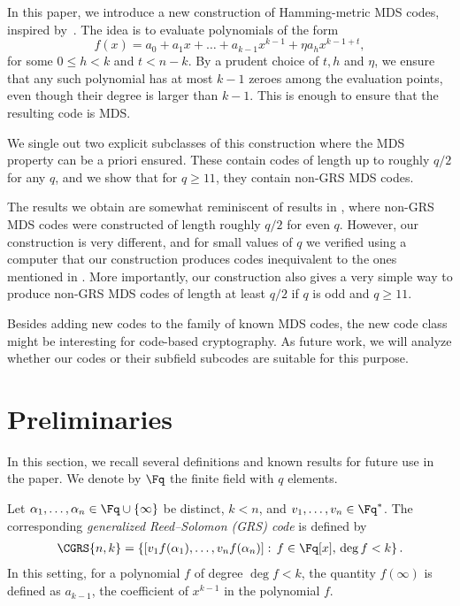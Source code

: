 \documentclass[conference,a4paper]{IEEEtran}
\begin{document}
In this paper, we introduce a new construction of Hamming-metric MDS codes, inspired by~\cite{sheekey_new_2015}.
The idea is to evaluate polynomials of the form
\[
  f(x) = a_0 + a_1 x + \ldots + a_{k-1} x^{k-1} + \eta a_h x^{k-1+t} ,
\]
for some $0 \leq h < k$ and $t < n-k$.
By a prudent choice of $t, h$ and $\eta$, we ensure that any such polynomial has at most $k-1$ zeroes among the evaluation points, even though their degree is larger than $k-1$.
This is enough to ensure that the resulting code is MDS.

We single out two explicit subclasses of this construction where the MDS property can be a priori ensured.
These contain codes of length up to roughly $q/2$ for any $q$, and we show that for $q \geq 11$, they contain non-GRS MDS codes.

The results we obtain are somewhat reminiscent of results in \cite{roth_construction_1989}, where non-GRS MDS codes were constructed of length roughly $q/2$ for even $q$.
However, our construction is very different, and for small values of $q$ we verified using a computer that our construction produces codes inequivalent to the ones mentioned in \cite{roth_construction_1989}.
More importantly, our construction also gives a very simple way to produce non-GRS MDS codes of length at least $q/2$ if $q$ is odd and $q \ge 11$. 

Besides adding new codes to the family of known MDS codes, the new code class might be interesting for code-based cryptography.
As future work, we will analyze whether our codes or their subfield subcodes are suitable for this purpose.


\section{Preliminaries}

\noindent
In this section, we recall several definitions and known results for future use in the paper. We denote by $\Fq$ the finite field with $q$ elements.

\begin{definition}
Let $\alpha_1,\dots,\alpha_n \in \Fq \cup \{\infty\}$ be distinct, $k<n$, and $v_1,\dots,v_n \in \Fq^*$. The corresponding \emph{generalized Reed--Solomon (GRS) code} is defined by
\begin{align*}
\CGRS{n,k} = \left\{ [v_1 f(\alpha_1), \dots, v_n f(\alpha_n)] : \, f \in \Fq[x], \, \deg f <k \right\}.
\end{align*}
In this setting, for a polynomial $f$ of degree $\deg f < k$, the quantity $f(\infty)$ is defined as $a_{k-1}$, the coefficient of $x^{k-1}$ in the polynomial $f$.
\end{definition}
\end{document}
